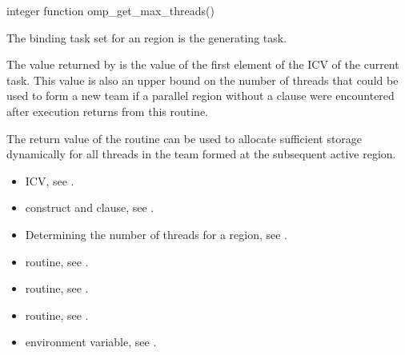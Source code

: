 \begin{fortranspecific}
\begin{ompfFunction}
integer function omp_get_max_threads()
\end{ompfFunction}
\end{fortranspecific}

\binding
The binding task set for an  region is the 
generating task.

\effect
The value returned by  is the value of the 
first element of the  ICV of the current task. This 
value is also an upper bound on the number of threads that could be 
used to form a new team if a parallel region without a  
clause were encountered after execution returns from this routine.

\begin{note}
The return value of the  routine can be used 
to allocate sufficient storage dynamically for all threads in the team 
formed at the subsequent active  region.
\end{note}

\crossreferences
\begin{itemize}
\item {} ICV, see
.

\item {} construct and  clause, see
.

\item Determining the number of threads for a  region, see
.

\item {} routine, see
.

\item {} routine, see
.

\item {} routine, see
.

\item {} environment variable, see
.
\end{itemize}



